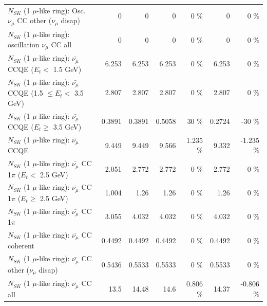 \begin{table}
\begin{tabular}{| l | r | r | r  r | r  r |}
         $N_{SK}$ (1 $\mu$-like ring): Osc. $\nu_\mu$ CC other ($\nu_\mu$ disap) &               0 &               0 &               0 &        0 \%  &               0 &        0 \%  \\ 
                      $N_{SK}$ (1 $\mu$-like ring): oscillation $\nu_\mu$ CC all &               0 &               0 &               0 &        0 \%  &               0 &        0 \%  \\ 
\hline
\hline
          $N_{SK}$ (1 $\mu$-like ring): $\bar{\nu_\mu}$ CCQE ($E_{t} <$ 1.5 GeV) &           6.253 &           6.253 &           6.253 &        0 \%  &           6.253 &        0 \%  \\ 
 $N_{SK}$ (1 $\mu$-like ring): $\bar{\nu_\mu}$ CCQE (1.5 $\leq E_{t} <$ 3.5 GeV) &           2.807 &           2.807 &           2.807 &        0 \%  &           2.807 &        0 \%  \\ 
       $N_{SK}$ (1 $\mu$-like ring): $\bar{\nu_\mu}$ CCQE ($E_{t} \geq$ 3.5 GeV) &          0.3891 &          0.3891 &          0.5058 &       30 \%  &          0.2724 &      -30 \%  \\ 
\hline
                              $N_{SK}$ (1 $\mu$-like ring): $\bar{\nu_\mu}$ CCQE &           9.449 &           9.449 &           9.566 &    1.235 \%  &           9.332 &   -1.235 \%  \\ 
\hline
     $N_{SK}$ (1 $\mu$-like ring): $\bar{\nu_\mu}$ CC 1$\pi$ ($E_{t} <$ 2.5 GeV) &           2.051 &           2.772 &           2.772 &        0 \%  &           2.772 &        0 \%  \\ 
  $N_{SK}$ (1 $\mu$-like ring): $\bar{\nu_\mu}$ CC 1$\pi$ ($E_{t} \geq$ 2.5 GeV) &           1.004 &            1.26 &            1.26 &        0 \%  &            1.26 &        0 \%  \\ 
\hline
                         $N_{SK}$ (1 $\mu$-like ring): $\bar{\nu_\mu}$ CC 1$\pi$ &           3.055 &           4.032 &           4.032 &        0 \%  &           4.032 &        0 \%  \\ 
                       $N_{SK}$ (1 $\mu$-like ring): $\bar{\nu_\mu}$ CC coherent &          0.4492 &          0.4492 &          0.4492 &        0 \%  &          0.4492 &        0 \%  \\ 
        $N_{SK}$ (1 $\mu$-like ring): $\bar{\nu_\mu}$ CC other ($\nu_\mu$ disap) &          0.5436 &          0.5533 &          0.5533 &        0 \%  &          0.5533 &        0 \%  \\ 
                          $N_{SK}$ (1 $\mu$-like ring): $\bar{\nu_{\mu}}$ CC all &            13.5 &           14.48 &            14.6 &    0.806 \%  &           14.37 &   -0.806 \%  \\ 

\end{tabular}
\end{table}
